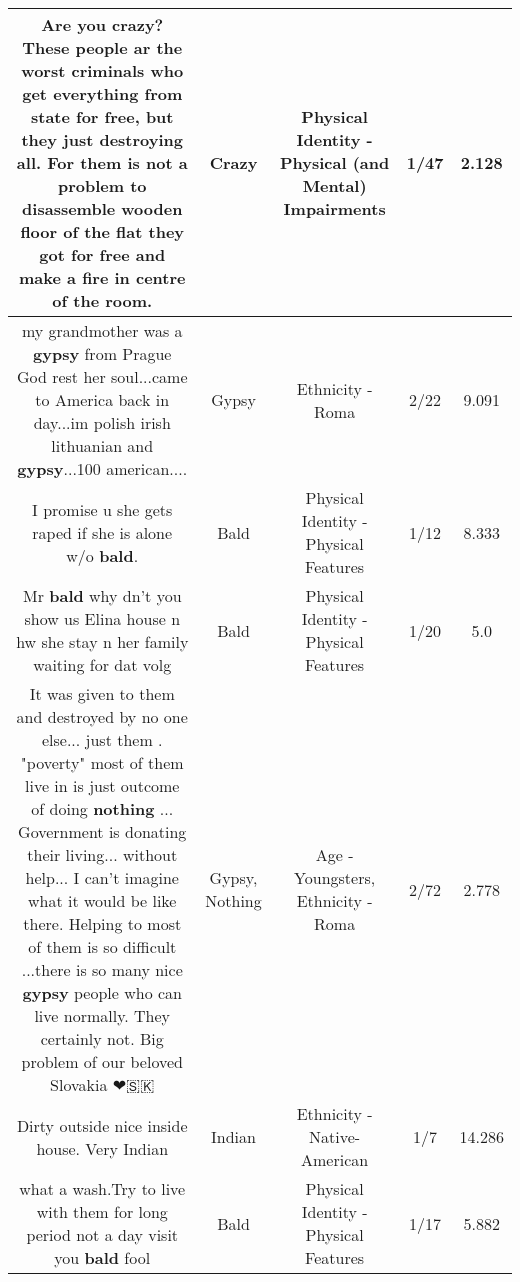 \documentclass[11pt]{article}
\newlength\mylength
\begin{document}
\begin{center}
\begin{longtable}{|C{.65\mylength}|C{.30\mylength}|C{.12\mylength}|C{.12\mylength}|C{.12\mylength}|}
  \small Are you \textbf{crazy}? These people ar the worst criminals who get everything from state for free, but they just destroying all. For them is not a problem to disassemble wooden floor of the flat they got for free and make a fire in centre of the room.\normalsize   & Crazy & Physical Identity - Physical (and Mental) Impairments & 1/47 & 2.128 \\  \hline
  \small my grandmother was a \textbf{gypsy} from Prague God rest her soul...came to America back in day...im polish irish lithuanian and \textbf{gypsy}...100 american....\normalsize   & Gypsy & Ethnicity - Roma & 2/22 & 9.091 \\  \hline
  \small I promise u she gets raped if she is alone w/o \textbf{bald}.\normalsize   & Bald & Physical Identity - Physical Features & 1/12 & 8.333 \\  \hline
  \small Mr \textbf{bald} why dn't you show us Elina house n hw she stay n her family waiting for dat volg\normalsize   & Bald & Physical Identity - Physical Features & 1/20 & 5.0 \\  \hline
  \small It was given to them and destroyed by no one else... just them . "poverty" most of them live in is just outcome of doing \textbf{nothing} ... Government is donating their living... without help... I can't imagine what it would be like there. Helping to most of them is so difficult ...there is so many nice \textbf{gypsy} people who can live normally. They certainly not. Big problem of our beloved Slovakia ❤🇸🇰\normalsize   & Gypsy, Nothing & Age - Youngsters, Ethnicity - Roma & 2/72 & 2.778 \\  \hline
  \small Dirty outside nice inside house. Very Indian\normalsize   & Indian & Ethnicity - Native-American & 1/7 & 14.286 \\  \hline
  \small what a wash.Try to live with them for long period not a day visit you \textbf{bald}  fool\normalsize   & Bald & Physical Identity - Physical Features & 1/17 & 5.882 \\  \hline

\end{longtable}
\end{center}
\end{document}
